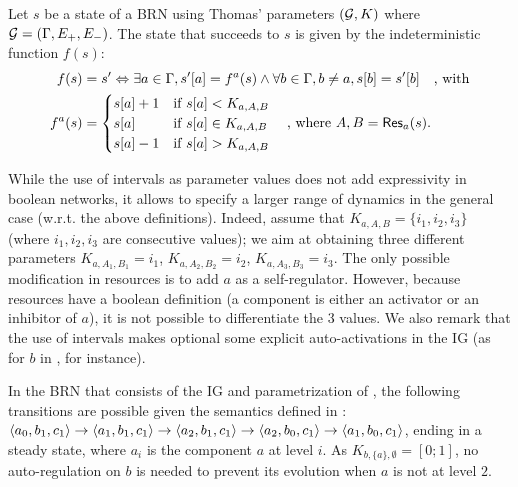 \begin{definition}\label{def:dynamics}
Let $s$ be a state of a BRN using Thomas' parameters $(\mathcal{G}, K)$ where $\mathcal{G} = (\Gamma, E_+, E_-)$.
The state that succeeds to $s$ is given by the indeterministic function $f(s)$:
\begin{align*}
  f(s)  & = s' \Leftrightarrow \exists a \in \Gamma,
    \GRNget{s'}{a} = f^a(s) \wedge
    \forall b \in \Gamma, b \neq a, \GRNget{s}{b} = \GRNget{s'}{b}
    \quad\text{, with}\\
  f^a(s) & =
  \begin{cases}
    \GRNget{s}{a} + 1 & \text{if } \GRNget{s}{a} < K_{a,A,B} \\%
    \GRNget{s}{a} & \text{if } \GRNget{s}{a} \in K_{a,A,B} \\ %
    \GRNget{s}{a} - 1 & \text{if } \GRNget{s}{a} > K_{a,A,B} %
  \end{cases}
\quad\text{, where $A,B=\GRNres{a}{s}$.}
\end{align*}
\end{definition}

While the use of intervals as parameter values does not add expressivity in boolean
networks, it allows to specify a larger range of dynamics in the general case (w.r.t. the above
definitions).
Indeed, assume that $K_{a,A,B} = \{i_1,i_2,i_3\}$ (where $i_1,i_2,i_3$ are consecutive values);
we aim at obtaining three different parameters $K_{a,A_1,B_1} = i_1$,  $K_{a,A_2,B_2} = i_2$,
$K_{a,A_3,B_3} = i_3$.
The only possible modification in resources is to add $a$ as a self-regulator.
However, because resources have a boolean definition (a component is either an activator or an inhibitor of
$a$), it is not possible to differentiate the 3 values.
We also remark that the use of intervals makes optional some explicit auto-activations in the IG
(as for $b$ in , for instance).

\begin{example*}
In the BRN that consists of the IG and parametrization of , the following
transitions are possible given the semantics defined in :
$\mbox{$\langle a_0, b_1, c_1 \rangle$} \rightarrow \mbox{$\langle a_1, b_1, c_1 \rangle$} \rightarrow \mbox{$\langle a_2, b_1, c_1 \rangle$} \rightarrow
\mbox{$\langle a_2, b_0, c_1 \rangle$} \rightarrow \mbox{$\langle a_1, b_0, c_1 \rangle$}$,
ending in a steady state,
where $a_i$ is the component $a$ at level $i$.
As $K_{b,\{a\},\emptyset} = [0 ; 1]$, no auto-regulation on $b$ is needed to prevent its evolution when $a$ is not at level $2$.
\end{example*}

